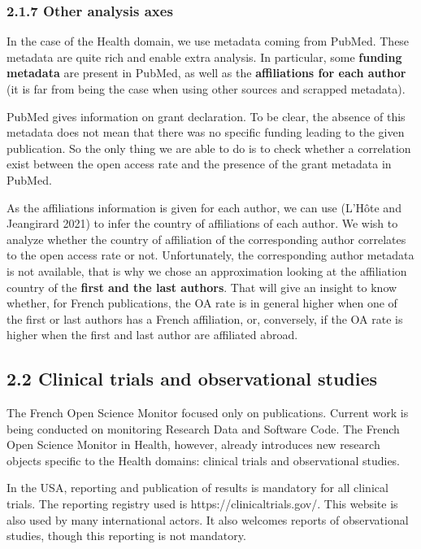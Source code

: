 \documentclass[
]{article}
\begin{document}
\hypertarget{other-analysis-axes}{%
\subsubsection{2.1.7 Other analysis axes}\label{other-analysis-axes}}

In the case of the Health domain, we use metadata coming from PubMed.
These metadata are quite rich and enable extra analysis. In particular,
some \textbf{funding metadata} are present in PubMed, as well as the
\textbf{affiliations for each author} (it is far from being the case
when using other sources and scrapped metadata).

PubMed gives information on grant declaration. To be clear, the absence
of this metadata does not mean that there was no specific funding
leading to the given publication. So the only thing we are able to do is
to check whether a correlation exist between the open access rate and
the presence of the grant metadata in PubMed.

As the affiliations information is given for each author, we can use
(L'Hôte and Jeangirard 2021) to infer the country of affiliations of
each author. We wish to analyze whether the country of affiliation of
the corresponding author correlates to the open access rate or not.
Unfortunately, the corresponding author metadata is not available, that
is why we chose an approximation looking at the affiliation country of
the \textbf{first and the last authors}. That will give an insight to
know whether, for French publications, the OA rate is in general higher
when one of the first or last authors has a French affiliation, or,
conversely, if the OA rate is higher when the first and last author are
affiliated abroad.

\hypertarget{clinical-trials-and-observational-studies}{%
\subsection{2.2 Clinical trials and observational
studies}\label{clinical-trials-and-observational-studies}}

The French Open Science Monitor focused only on publications. Current
work is being conducted on monitoring Research Data and Software Code.
The French Open Science Monitor in Health, however, already introduces
new research objects specific to the Health domains: clinical trials and
observational studies.

In the USA, reporting and publication of results is mandatory for all
clinical trials. The reporting registry used is
https://clinicaltrials.gov/. This website is also used by many
international actors. It also welcomes reports of observational studies,
though this reporting is not mandatory.
\end{document}
